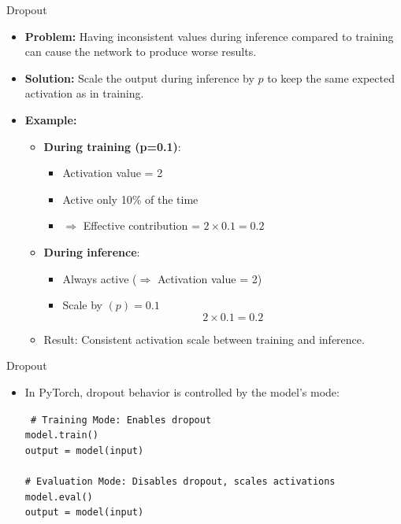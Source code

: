 \documentclass[10pt]{beamer}
\theoremstyle{remark}
\theoremstyle{definition}
\begin{document}
\begin{frame}{Dropout}
\begin{itemize}
    \item \textbf{Problem:} Having inconsistent values during inference compared to training can cause the network to produce worse results.
    \item \textbf{Solution:} Scale the output during inference by \(p\) to keep the same expected activation as in training.
    \item \textbf{Example:}
    \begin{itemize}
  \item \textbf{During training (p=0.1)}: 
    \begin{itemize}
      \item Activation value = 2
      \item Active only 10\% of the time 
      \item \(\Rightarrow\) Effective contribution = \(2 \times 0.1 = 0.2\)
    \end{itemize}
  \item \textbf{During inference}: 
    \begin{itemize}
      \item Always active (\(\Rightarrow\) Activation value = 2)
      \item Scale by \((p) = 0.1\)
      \[
        2 \times 0.1 = 0.2
      \]
    \end{itemize}
  \item Result: Consistent activation scale between training and inference.
\end{itemize}

\end{itemize}
\end{frame}


\begin{frame}{Dropout}
    \begin{itemize}
        \item In PyTorch, dropout behavior is controlled by the model's mode:
            \begin{block}{}
        \texttt{\small
        \# Training Mode: Enables dropout\\
        model.train() \\
        output = model(input) \\
        \\
        \# Evaluation Mode: Disables dropout, scales activations\\
        model.eval() \\
        output = model(input)
        }
    \end{block}

    \end{itemize}


\end{frame}
\end{document}
